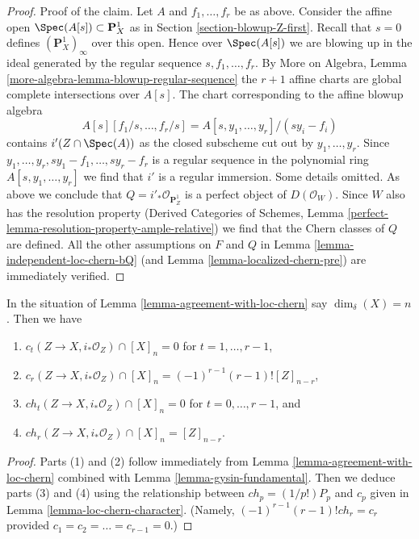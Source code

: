 \begin{proof}
\medskip\noindent
Proof of the claim. Let $A$ and $f_1, \ldots, f_r$ be as above.
Consider the affine open $\Spec(A[s]) \subset \mathbf{P}^1_X$
as in Section \ref{section-blowup-Z-first}. Recall that $s = 0$
defines $(\mathbf{P}^1_X)_\infty$ over this open. Hence over
$\Spec(A[s])$ we are blowing up in the ideal generated by
the regular sequence $s, f_1, \ldots, f_r$. By More on Algebra, Lemma
\ref{more-algebra-lemma-blowup-regular-sequence} the $r + 1$
affine charts are global complete intersections over $A[s]$.
The chart corresponding to the affine blowup algebra
$$
A[s][f_1/s, \ldots, f_r/s] = A[s, y_1, \ldots, y_r]/(sy_i - f_i)
$$
contains $i'(Z \cap \Spec(A))$ as the closed subscheme cut out by
$y_1, \ldots, y_r$. Since $y_1, \ldots, y_r, sy_1 - f_1, \ldots, sy_r - f_r$
is a regular sequence in the polynomial ring $A[s, y_1, \ldots, y_r]$
we find that $i'$ is a regular immersion. Some details omitted.
As above we conclude that $Q = i'_*\mathcal{O}_{\mathbf{P}^1_Z}$
is a perfect object of $D(\mathcal{O}_W)$. Since $W$ also has
the resolution property (Derived Categories of Schemes,
Lemma \ref{perfect-lemma-resolution-property-ample-relative})
we find that the Chern classes of $Q$ are defined. All the
other assumptions on $F$ and $Q$ in Lemma \ref{lemma-independent-loc-chern-bQ}
(and Lemma \ref{lemma-localized-chern-pre}) are immediately verified.
\end{proof}

\begin{lemma}
\label{lemma-actual-computation}
In the situation of Lemma \ref{lemma-agreement-with-loc-chern}
say $\dim_\delta(X) = n$. Then we have
\begin{enumerate}
\item $c_t(Z \to X, i_*\mathcal{O}_Z) \cap [X]_n = 0$ for
$t = 1, \ldots, r - 1$,
\item $c_r(Z \to X, i_*\mathcal{O}_Z) \cap [X]_n =
(-1)^{r - 1}(r - 1)![Z]_{n - r}$,
\item $ch_t(Z \to X, i_*\mathcal{O}_Z) \cap [X]_n = 0$ for
$t = 0, \ldots, r - 1$, and
\item $ch_r(Z \to X, i_*\mathcal{O}_Z) \cap [X]_n = [Z]_{n - r}$.
\end{enumerate}
\end{lemma}

\begin{proof}
Parts (1) and (2) follow immediately from
Lemma \ref{lemma-agreement-with-loc-chern}
combined with Lemma \ref{lemma-gysin-fundamental}.
Then we deduce parts (3) and (4) using the relationship
between $ch_p = (1/p!)P_p$ and $c_p$ given in
Lemma \ref{lemma-loc-chern-character}. (Namely,
$(-1)^{r - 1}(r - 1)!ch_r = c_r$ provided
$c_1 = c_2 = \ldots = c_{r - 1} = 0$.)
\end{proof}







